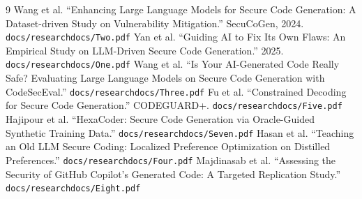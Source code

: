 \documentclass[11pt,a4paper]{article}
\begin{document}
\begin{thebibliography}{9}
 Wang et al. ``Enhancing Large Language Models for Secure Code Generation: A Dataset-driven Study on Vulnerability Mitigation.'' SecuCoGen, 2024. \texttt{docs/researchdocs/Two.pdf}
 Yan et al. ``Guiding AI to Fix Its Own Flaws: An Empirical Study on LLM-Driven Secure Code Generation.'' 2025. \texttt{docs/researchdocs/One.pdf}
 Wang et al. ``Is Your AI-Generated Code Really Safe? Evaluating Large Language Models on Secure Code Generation with CodeSecEval.'' \texttt{docs/researchdocs/Three.pdf}
 Fu et al. ``Constrained Decoding for Secure Code Generation.'' CODEGUARD+. \texttt{docs/researchdocs/Five.pdf}
 Hajipour et al. ``HexaCoder: Secure Code Generation via Oracle-Guided Synthetic Training Data.'' \texttt{docs/researchdocs/Seven.pdf}
 Hasan et al. ``Teaching an Old LLM Secure Coding: Localized Preference Optimization on Distilled Preferences.'' \texttt{docs/researchdocs/Four.pdf}
 Majdinasab et al. ``Assessing the Security of GitHub Copilot's Generated Code: A Targeted Replication Study.'' \texttt{docs/researchdocs/Eight.pdf}
\end{thebibliography}
\end{document}
